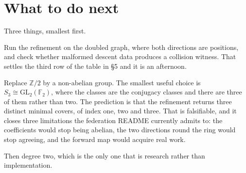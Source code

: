 \documentclass[11pt,a4paper]{article}
\begin{document}
\section{What to do next}

Three things, smallest first.

Run the refinement on the doubled graph, where both directions are positions,
and check whether malformed descent data produces a collision witness. That
settles the third row of the table in \S5 and it is an afternoon.

Replace $\mathbb{Z}/2$ by a non-abelian group. The smallest useful choice is
$S_3 \cong \mathrm{GL}_2(\mathbb{F}_2)$, where the classes are the conjugacy
classes and there are three of them rather than two. The prediction is that the
refinement returns three distinct minimal covers, of index one, two and three.
That is falsifiable, and it closes three limitations the federation README
currently admits to: the coefficients would stop being abelian, the two
directions round the ring would stop agreeing, and the forward map would acquire
real work.

Then degree two, which is the only one that is research rather than
implementation.
\end{document}
